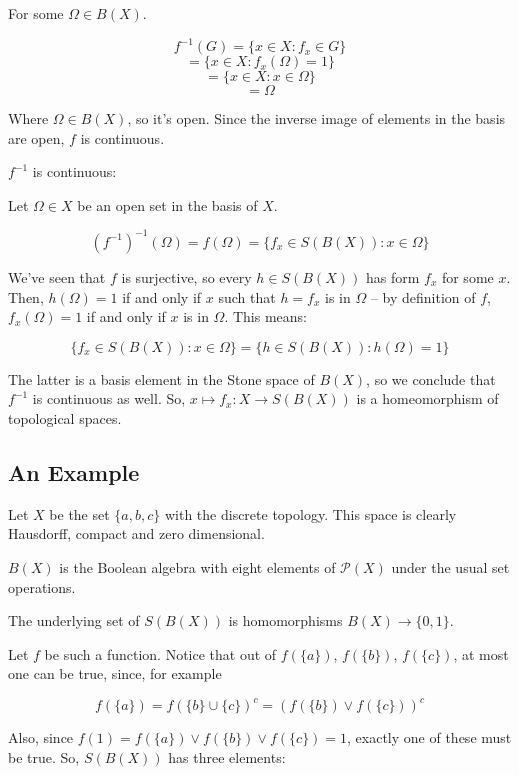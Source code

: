 \documentclass{article}
\begin{document}
      For some $\Omega \in B(X)$.

      \[f^{-1}(G) = \{x \in X : f_x \in G\}\]
      \[ = \{x \in X : f_x(\Omega) = 1\}\]
      \[ = \{x \in X : x \in \Omega\}\]
      \[ = \Omega\]

      Where $\Omega \in B(X)$, so it's open. Since the inverse image of elements
      in the basis are open, $f$ is continuous.

      $f^{-1}$ is continuous:

      Let $\Omega \in X$ be an open set in the basis of $X$.

      \[(f^{-1})^{-1}(\Omega) = f(\Omega) = \{f_x \in S(B(X)) : x \in \Omega\}\]

      We've seen that $f$ is surjective, so every $h \in S(B(X))$ has form $f_x$
      for some $x$. Then, $h(\Omega) = 1$ if and only if $x$ such that $h = f_x$
      is in $\Omega$ -- by definition of $f$, $f_x(\Omega) = 1$ if and only if
      $x$ is in $\Omega$. This means:

      \[\{f_x \in S(B(X)) : x \in \Omega\} = \{h \in S(B(X)) : h(\Omega) = 1\}\]

      The latter is a basis element in the Stone space of $B(X)$, so we conclude
      that $f^{-1}$ is continuous as well. So, $x \mapsto f_x: X \rightarrow
      S(B(X))$ is a homeomorphism of topological spaces.

      \subsection{An Example}

        Let $X$ be the set $\{a,b,c\}$ with the discrete topology. This space is
        clearly Hausdorff, compact and zero dimensional.

        $B(X)$ is the Boolean algebra with eight elements of $\mathcal{P}(X)$
        under the usual set operations.

        The underlying set of $S(B(X))$ is homomorphisms $B(X) \to \{0,1\}$.

        Let $f$ be such a function. Notice that out of $f(\{a\})$, $f(\{b\})$,
        $f(\{c\})$, at most one can be true, since, for example

        \[f(\{a\}) = f(\{b\} \cup \{c\})^c = (f(\{b\}) \vee f(\{c\}))^c\]

        Also, since $f(1) = f(\{a\}) \vee f(\{b\}) \vee f(\{c\}) = 1$, exactly
        one of these must be true. So, $S(B(X))$ has three elements:
\end{document}
